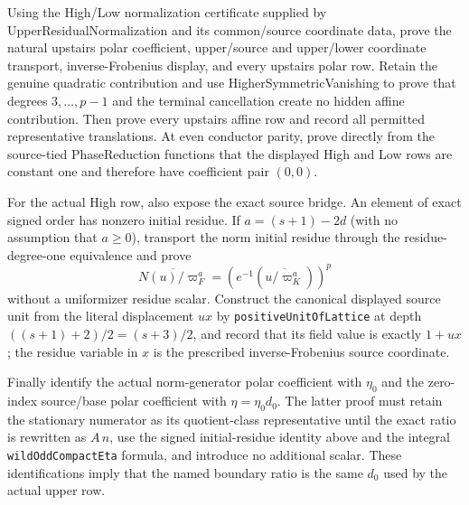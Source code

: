 \begin{lemma}
\label{mod:cases-wildodd-upperresidualcoefficients}
Using the High/Low normalization certificate supplied by
UpperResidualNormalization and its common/source coordinate data, prove the
natural upstairs polar coefficient, upper/source and upper/lower coordinate
transport, inverse-Frobenius display, and every upstairs polar row.  Retain the
genuine quadratic contribution and use HigherSymmetricVanishing to prove that
degrees $3,\ldots,p-1$ and the terminal cancellation create no hidden affine
contribution.  Then prove every upstairs affine row and record all permitted
representative translations.  At even conductor parity, prove directly from
the source-tied PhaseReduction functions that the displayed High and Low rows
are constant one and therefore have coefficient pair $(0,0)$.

For the actual High row, also expose the exact source bridge.  An element of
exact signed order has nonzero initial residue.  If
$a=(s+1)-2d$ (with no assumption that $a\geq 0$), transport the norm initial
residue through the residue-degree-one equivalence and prove
\[
 \overline{N(u)/\varpi_F^a}
   =\left(e^{-1}\!\left(\overline{u/\varpi_K^a}\right)\right)^p
\]
without a uniformizer residue scalar.  Construct the canonical displayed
source unit from the literal displacement $u x$ by
\texttt{positiveUnitOfLattice} at depth
$((s+1)+2)/2=(s+3)/2$, and record that its field value is exactly $1+ux$;
the residue variable in $x$ is the prescribed inverse-Frobenius source
coordinate.

Finally identify the actual norm-generator polar coefficient with $\eta_0$
and the zero-index source/base polar coefficient with
$\eta=\eta_0d_0$.  The latter proof must retain the stationary numerator as
its quotient-class representative until the exact ratio is rewritten as
$A\,n$, use the signed initial-residue identity above and the integral
\texttt{wildOddCompactEta} formula, and introduce no additional scalar.  These
identifications imply that the named boundary ratio is the same $d_0$ used by
the actual upper row.


\end{lemma}
